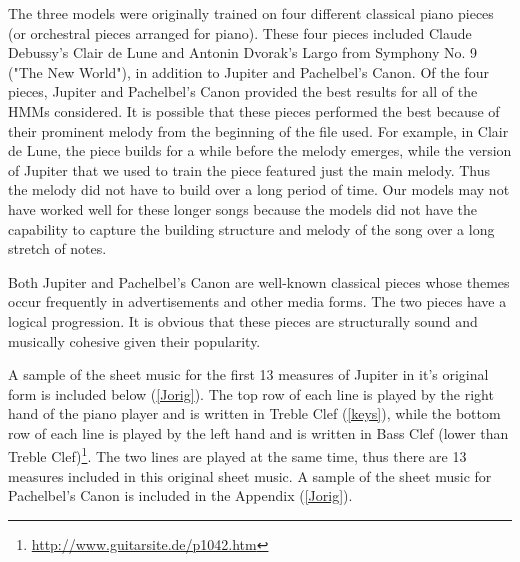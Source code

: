 \documentclass{article} %
\begin{document}
The three models were originally trained on four different classical piano pieces (or orchestral pieces arranged for piano).  These four pieces included Claude Debussy's Clair de Lune and Antonin Dvorak's Largo from Symphony No. 9 ("The New World"), in addition to Jupiter and Pachelbel's Canon.  Of the four pieces, Jupiter and Pachelbel's Canon provided the best results for all of the HMMs considered. It is possible that these pieces performed the best because of their prominent melody from the beginning of the file used. For example, in  Clair de Lune, the piece builds for a while before the melody emerges, while the version of Jupiter that we used to train the piece featured just the main melody. Thus the melody did not have to build over a long period of time. Our models may not have worked well for these longer songs because the models did not have the capability to capture the building structure and melody of the song over a long stretch of notes.  

Both Jupiter and Pachelbel's Canon are well-known classical pieces whose themes occur frequently in advertisements and other media forms. The two pieces have a logical progression. It is obvious that these pieces are structurally sound and musically cohesive given their popularity. 

 A sample of the sheet music for the first 13 measures of Jupiter in it's original form is included below (\autoref{Jorig}).  The top row of each line is played by the right hand of the piano player and is written in Treble Clef (\autoref{keys}), while the bottom row of each line is played by the left hand and is written in Bass Clef  (lower than Treble Clef)\footnote{\url{http://www.guitarsite.de/p1042.htm}}. The two lines are played at the same time, thus there are 13 measures included in this original sheet music.  A sample of the sheet music for Pachelbel's Canon is included in the Appendix (\autoref{Jorig}).
 

 
 
\end{document}

